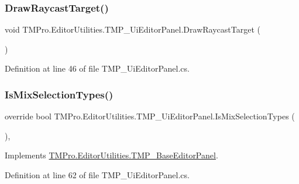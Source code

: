 \subsubsection{\texorpdfstring{DrawRaycastTarget()}{DrawRaycastTarget()}}
{\footnotesize\ttfamily void T\+M\+Pro.\+Editor\+Utilities.\+T\+M\+P\+\_\+\+Ui\+Editor\+Panel.\+Draw\+Raycast\+Target (\begin{DoxyParamCaption}{ }\end{DoxyParamCaption})\hspace{0.3cm}{\ttfamily [protected]}}



Definition at line 46 of file T\+M\+P\+\_\+\+Ui\+Editor\+Panel.\+cs.

\mbox{\label{class_t_m_pro_1_1_editor_utilities_1_1_t_m_p___ui_editor_panel_abfd7483420d93f260bd25c932613f6db}} 
\subsubsection{\texorpdfstring{IsMixSelectionTypes()}{IsMixSelectionTypes()}}
{\footnotesize\ttfamily override bool T\+M\+Pro.\+Editor\+Utilities.\+T\+M\+P\+\_\+\+Ui\+Editor\+Panel.\+Is\+Mix\+Selection\+Types (\begin{DoxyParamCaption}{ }\end{DoxyParamCaption})\hspace{0.3cm}{\ttfamily [protected]}, {\ttfamily [virtual]}}



Implements \mbox{\hyperlink{class_t_m_pro_1_1_editor_utilities_1_1_t_m_p___base_editor_panel_a2d01dae660062e1028c4b28f40689aa9}{T\+M\+Pro.\+Editor\+Utilities.\+T\+M\+P\+\_\+\+Base\+Editor\+Panel}}.



Definition at line 62 of file T\+M\+P\+\_\+\+Ui\+Editor\+Panel.\+cs.

\mbox{\label{class_t_m_pro_1_1_editor_utilities_1_1_t_m_p___ui_editor_panel_a24f0d3266f3db540b638e349e29793d9}} 
